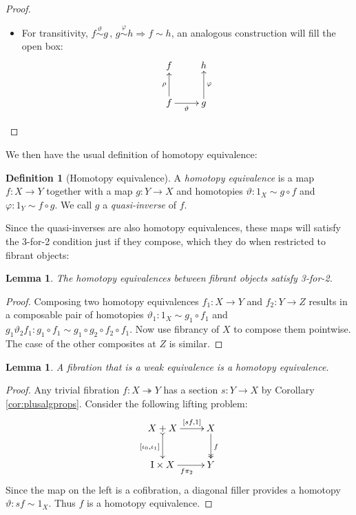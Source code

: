 \documentclass[11pt,reqno]{amsart}
\newcommand{\ra}{\ensuremath{\rightarrow}}
\renewcommand{\to}{\ensuremath{\rightarrow}}
\newcommand{\onto}{\ensuremath{\twoheadrightarrow}}
\newcommand{\I}{\ensuremath{\mathrm{I}}}
\newtheorem{lemma}[theorem]{Lemma}
\theoremstyle{remark}
\theoremstyle{definition}
\newtheorem{definition}[theorem]{Definition}
\begin{document}
\begin{proof}
\begin{itemize}
\item For transitivity, $f\stackrel{\vartheta}{\sim} g\,,\, g\stackrel{\varphi}{\sim} h\Rightarrow f\sim h$, an analogous  construction will fill the open box:
\begin{equation*}%
\xymatrix{
f  & h  \\
f \ar[u]^{\rho} \ar[r]_\vartheta & g \ar[u]_\varphi
}
\end{equation*}
\end{itemize}
\end{proof}

We then have the usual definition of homotopy equivalence: 
\begin{definition}[Homotopy equivalence]\label{def:homotopyequivalence} 
A \emph{homotopy equivalence} is a map $f : X\to Y$ together with a map $g: Y\ra X$ and homotopies $\vartheta : 1_X \sim g\circ f$ and $\varphi : 1_Y\sim f\circ g$.  We call $g$ a \emph{quasi-inverse} of $f$.
\end{definition}
%
Since the quasi-inverses are also homotopy equivalences, these maps will satisfy the 3-for-2 condition just if they compose, which they do when restricted to fibrant objects:   
%
\begin{lemma}\label{lemma:HE342}
The homotopy equivalences between fibrant objects satisfy 3-for-2. 
\end{lemma}
%
\begin{proof}
Composing two homotopy equivalences $f_1 : X\to Y$ and $f_2 : Y\to Z$ results in a composable pair of homotopies $\vartheta_1 : 1_X \sim g_1\circ f_1$ and 
$g_1 \vartheta_2  f_1: g_1\circ f_1\sim g_1\circ g_2 \circ f_2\circ f_1$. Now use fibrancy of $X$ to compose them pointwise.  The case of the other composites at $Z$ is similar.
\end{proof}

%
\begin{lemma}\label{lem:TFibisHE}
A fibration that is a weak equivalence is a homotopy equivalence.
\end{lemma}
\begin{proof}
Any trivial fibration $f : X \onto Y$ has a section $s: Y\to X$ by Corollary \ref{cor:plusalgprops}.
Consider the following lifting problem:
\begin{equation*}%
\xymatrix{
X+X \ar@{>->}[d]_{[\iota_0, \iota_1]} \ar[r]^-{[sf, 1]}  & X\ar@{>>}[d]^{f} \\
\I\times X \ar[r]_{f\pi_2} & Y
}
\end{equation*}
Since the map on the left is a cofibration, a diagonal filler provides a homotopy $\vartheta : sf \sim 1_X$. 
Thus $f$ is a homotopy equivalence. 
\end{proof}
\end{document}
